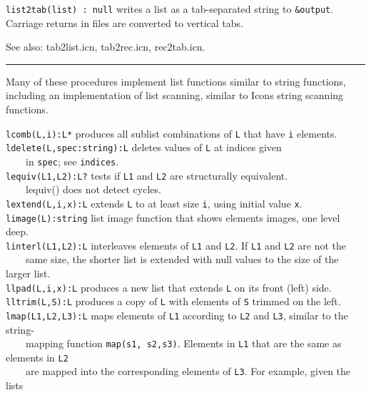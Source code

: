 \texttt{list2tab(list) : null} writes a list as a tab-separated string
to \texttt{\&output}. Carriage returns in files are converted to
vertical tabs.

See also: tab2list.icn, tab2rec.icn, rec2tab.icn. 

\vspace{0.25cm}\hrule{}

Many of these procedures implement list functions
similar to string functions, including an implementation of
list scanning, similar to Icon{\textquotesingle}s
string scanning functions.

\texttt{lcomb(L,i):L*} produces all sublist combinations of \texttt{L}
that have \texttt{i} elements.\\
\texttt{ldelete(L,spec:string):L} deletes values of \texttt{L} at
indices given\\
 \ \ \ \ in \texttt{spec}; see \texttt{indices}.\\
\texttt{lequiv(L1,L2):L?} tests if \texttt{L1} and \texttt{L2} are
structurally equivalent.\\
 \ \ \ \ lequiv() does not detect cycles.\\
\texttt{lextend(L,i,x):L} extends \texttt{L} to at least size
\texttt{i}, using initial value \texttt{x}.\\
\texttt{limage(L):string} list image function that shows
elements{\textquotesingle} images, one level deep.\\
\texttt{linterl(L1,L2):L} interleaves elements of \texttt{L1} and
\texttt{L2}. If \texttt{L1} and \texttt{L2} are not the\\
 \ \ \ \ same size, the shorter list is extended with null values to the
size of the larger list.\\
\texttt{llpad(L,i,x):L} produces a new list that extends \texttt{L} on
its front (left) side.\\
\texttt{lltrim(L,S):L} produces a copy of \texttt{L} with elements of
\texttt{S} trimmed on the left.\\
\texttt{lmap(L1,L2,L3):L} maps elements of \texttt{L1} according to
\texttt{L2} and \texttt{L3}, similar to the string-\\
 \ \ \ \ mapping function \texttt{map(s1, s2,s3)}. Elements in
\texttt{L1} that are the same as elements in \texttt{L2}\\
 \ \ \ \ are mapped into the corresponding elements of \texttt{L3}. For
example, given the lists\\
